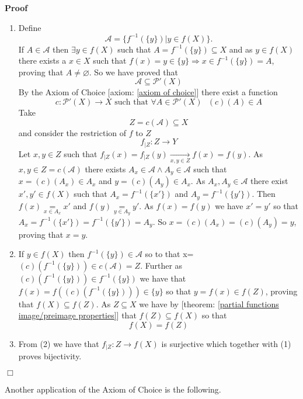 \documentclass{book}
\newcommand{\Rightarrowlim}{\mathop{\rightarrow}\limits}
\newcommand{\equallim}{\mathop{=}\limits}
\newenvironment{proof}{\noindent\textbf{Proof\ }}{\hspace*{\fill}$\Box$\medskip}
\begin{document}
\begin{proof}
  
  \begin{enumerate}
    \item Define
    \[ \mathcal{A}= \{ f^{- 1} (\{ y \}) |y \in f (X) \} . \]
    If $A \in \mathcal{A}$ then $\exists y \in f (X)$ such that $A = f^{- 1}
    (\{ y \}) \subseteq X$ and as $y \in f (X)$ there exists a $x \in X$ such
    that $f (x) = y \in \{ y \} \Rightarrow x \in f^{- 1} (\{ y \}) = A$,
    proving that $A \neq \varnothing$. So we have proved that
    \[ \mathcal{A} \subseteq \mathcal{P}' (X) \]
    By the Axiom of Choice [axiom: \ref{axiom of choice}] there exist a
    function
    \[ c : \mathcal{P}' (X) \rightarrow X \text{ such that } \forall A \in
       \mathcal{P}' (X) \text{ } (c) (A) \in A \]
    Take
    \[ Z = c (\mathcal{A}) \subseteq X \]
    and consider the restriction of $f$ to $Z$
    \[ f_{|Z} : Z \rightarrow Y \]
    Let $x, y \in Z$ such that $f_{|Z} (x) = f_{|Z} (y) \Rightarrowlim_{x, y
    \in Z} f (x) = f (y)$. As $x, y \in Z = c (\mathcal{A})$ there exists $A_x
    \in \mathcal{A} \wedge A_y \in \mathcal{A}$ such that $x = (c) (A_x) \in
    A_x$ and $y = (c) (A_y) \in A_x$. As $A_x, A_y \in \mathcal{A}$ there
    exist $x', y' \in f (X)$ such that $A_x = f^{- 1} (\{ x' \})$ and $A_y =
    f^{- 1} (\{ y' \})$. Then $f (x) \equallim_{x \in A_x} x'$ and $f (y)
    \equallim_{y \in A_y} y'$. As $f (x) = f (y)$ we have $x' = y'$ so that
    $A_x = f^{- 1} (\{ x' \}) = f^{- 1} (\{ y' \}) = A_y$. So $x = (c) (A_x) =
    (c) (A_y) = y$, proving that $x = y$.
    
    \item If $y \in f (X)$ then $f^{- 1} (\{ y \}) \in \mathcal{A}$ so to
    that x=$(c) (f^{- 1} (\{ y \})) \in c (\mathcal{A}) = Z$. Further as $(c)
    (f^{- 1} (\{ y \})) \in f^{- 1} (\{ y \})$ we have that $f (x) = f ((c)
    (f^{- 1} (\{ y \}))) \in \{ y \}$ so that $y = f (x) \in f (Z)$, proving
    that $f (X) \subseteq f (Z)$. As $Z \subseteq X$ we have by [theorem:
    \ref{partial functions image/preimage properties}] that $f (Z) \subseteq f
    (X)$ so that
    \[ f (X) = f (Z) \]
    \item From (2) we have that $f_{|Z} : Z \rightarrow f (X)$ is surjective
    which together with (1) proves bijectivity.
  \end{enumerate}
\end{proof}

Another application of the Axiom of Choice is the following.
\end{document}
